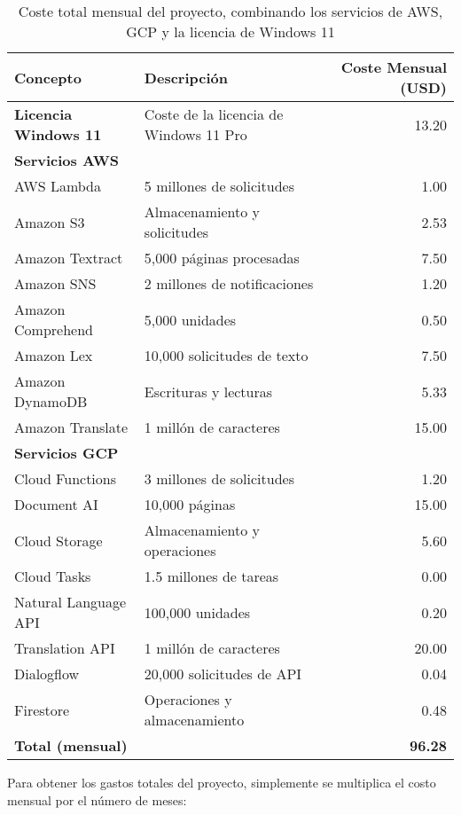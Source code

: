 \begin{enumerate}
		\begin{table}[h]
			\centering
			\begin{tabularx}
				{\textwidth}{@{}lXr@{}} \toprule \textbf{Concepto} & \textbf{Descripción}
				& \textbf{Coste Mensual (USD)} \\ \midrule \textbf{Licencia Windows 11}
				& Coste de la licencia de Windows 11 Pro & 13.20 \\ \midrule \textbf{Servicios
				AWS} & & \\ AWS Lambda & 5 millones de solicitudes & 1.00 \\ Amazon S3 &
				Almacenamiento y solicitudes & 2.53 \\ Amazon Textract & 5,000 páginas procesadas
				& 7.50 \\ Amazon SNS & 2 millones de notificaciones & 1.20 \\ Amazon Comprehend
				& 5,000 unidades & 0.50 \\ Amazon Lex & 10,000 solicitudes de texto & 7.50
				\\ Amazon DynamoDB & Escrituras y lecturas & 5.33 \\ Amazon Translate & 1
				millón de caracteres & 15.00 \\ \midrule \textbf{Servicios GCP} & & \\
				Cloud Functions & 3 millones de solicitudes & 1.20 \\ Document AI & 10,000
				páginas & 15.00 \\ Cloud Storage & Almacenamiento y operaciones & 5.60
				\\ Cloud Tasks & 1.5 millones de tareas & 0.00 \\ Natural Language API &
				100,000 unidades & 0.20 \\ Translation API & 1 millón de caracteres &
				20.00 \\ Dialogflow & 20,000 solicitudes de API & 0.04 \\ Firestore &
				Operaciones y almacenamiento & 0.48 \\ \midrule \textbf{Total (mensual)}
				& & \textbf{96.28} \\ \bottomrule
			\end{tabularx}
			\caption{Coste total mensual del proyecto, combinando los servicios de AWS,
			GCP y la licencia de Windows 11}
			\label{tab:coste_total}
		\end{table}

		Para obtener los gastos totales del proyecto, simplemente se multiplica el
		costo mensual por el número de meses:


\end{enumerate}
